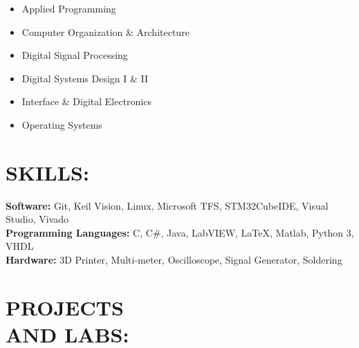 \documentclass[line,margin]{res}
\begin{document}
\begin{resume}
		\begin{multicols}{2}
			\setlength\columnsep{1pt}
			\begin{itemize}
				\setlength{\itemindent}{-10pt}
				\item[] Applied Programming
				\item[] Computer Organization \& Architecture
				\item[] Digital Signal Processing
				\item[] \hspace{10pt} Digital Systems Design I \& II
				\item[] \hspace{10pt} Interface \& Digital Electronics
				\item[] \hspace{10pt} Operating Systems
			\end{itemize}
		\end{multicols}

	\section{SKILLS:}

		\textbf{Software:} Git, Keil \si{\micro}\hspace{-.5pt}Vision, Linux, Microsoft TFS, STM32CubeIDE, Visual Studio, Vivado\\
		\textbf{Programming Languages:} C, C\#, Java, LabVIEW, \LaTeX, Matlab, Python 3, VHDL \\
		\textbf{Hardware:} 3D Printer, Multi-meter, Oscilloscope, Signal Generator, Soldering

	\section{PROJECTS \\AND LABS:}



\end{resume}
\end{document}
